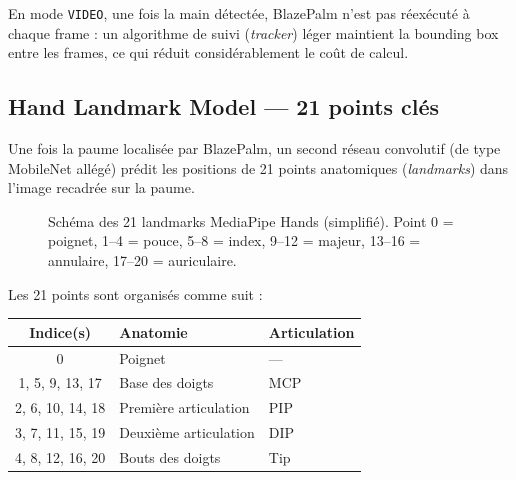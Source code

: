 \documentclass[12pt, a4paper]{article}
\newcommand{\code}[1]{\texttt{\small #1}}
\begin{document}
En mode \code{VIDEO}, une fois la main détectée, BlazePalm n'est pas réexécuté
à chaque frame : un algorithme de suivi (\emph{tracker}) léger maintient la
bounding box entre les frames, ce qui réduit considérablement le coût de calcul.

\subsection{Hand Landmark Model --- 21 points clés}

Une fois la paume localisée par BlazePalm, un second réseau convolutif (de type
MobileNet allégé) prédit les positions de 21 points anatomiques (\emph{landmarks})
dans l'image recadrée sur la paume.

\begin{figure}[H]
  \centering
  \caption{Schéma des 21 landmarks MediaPipe Hands (simplifié). Point 0 = poignet,
           1--4 = pouce, 5--8 = index, 9--12 = majeur, 13--16 = annulaire, 17--20 = auriculaire.}
  \label{fig:landmarks_schema}
\end{figure}

Les 21 points sont organisés comme suit :

\begin{center}
\begin{tabular}{@{}cll@{}}
  \toprule
  \textbf{Indice(s)} & \textbf{Anatomie} & \textbf{Articulation} \\
  \midrule
  0  & Poignet & --- \\
  1, 5, 9, 13, 17 & Base des doigts & MCP \\
  2, 6, 10, 14, 18 & Première articulation & PIP \\
  3, 7, 11, 15, 19 & Deuxième articulation & DIP \\
  4, 8, 12, 16, 20 & Bouts des doigts & Tip \\
  \bottomrule
\end{tabular}
\end{center}
\end{document}
